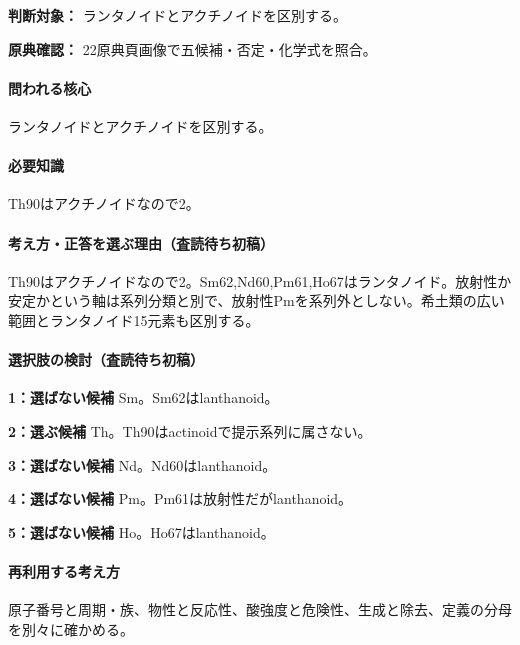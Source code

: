 \noindent\textbf{判断対象：} ランタノイドとアクチノイドを区別する。\par

\noindent\textbf{原典確認：} 22原典頁画像で五候補・否定・化学式を照合。\par

\paragraph{問われる核心} ランタノイドとアクチノイドを区別する。

\paragraph{必要知識} Th90はアクチノイドなので2。

\paragraph{考え方・正答を選ぶ理由（査読待ち初稿）} Th90はアクチノイドなので2。Sm62,Nd60,Pm61,Ho67はランタノイド。放射性か安定かという軸は系列分類と別で、放射性Pmを系列外としない。希土類の広い範囲とランタノイド15元素も区別する。

\paragraph{選択肢の検討（査読待ち初稿）}\mbox{}\par

\noindent\textbf{1：選ばない候補} Sm。Sm62はlanthanoid。\par

\noindent\textbf{2：選ぶ候補} Th。Th90はactinoidで提示系列に属さない。\par

\noindent\textbf{3：選ばない候補} Nd。Nd60はlanthanoid。\par

\noindent\textbf{4：選ばない候補} Pm。Pm61は放射性だがlanthanoid。\par

\noindent\textbf{5：選ばない候補} Ho。Ho67はlanthanoid。\par

\paragraph{再利用する考え方} 原子番号と周期・族、物性と反応性、酸強度と危険性、生成と除去、定義の分母を別々に確かめる。

